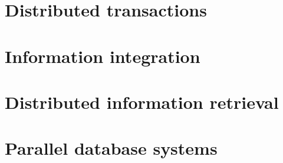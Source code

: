 \documentclass[10pt,a4paper]{article}
\begin{document}
\section{Distributed transactions}

\section{Information integration}

\section{Distributed information retrieval}

\section{Parallel database systems}
	
\end{document}
